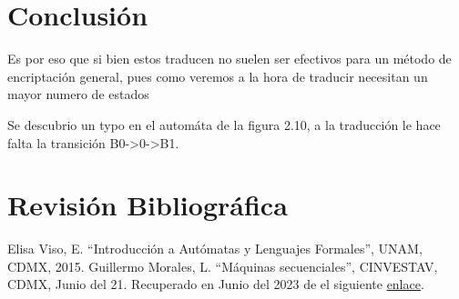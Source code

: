 \documentclass[11pt,letterpaper]{article}
\begin{document}
\begin{multicols}{2}
  \section{Conclusión}
  Es por eso que si bien estos traducen no suelen ser efectivos
  para un método de encriptación general, pues como veremos a la hora de traducir necesitan
  un mayor numero de estados

  Se descubrio un typo en el automáta de la figura 2.10\cite{Viso}, a la traducción
  le hace falta la transición B0->0->B1.
  \section{Revisión Bibliográfica}  
  \begin{thebibliography}{1}
   Elisa Viso, E. ``Introducción a Autómatas y Lenguajes Formales'',
    UNAM, CDMX, 2015.
   Guillermo Morales, L.  ``Máquinas secuenciales'',
    CINVESTAV, CDMX, Junio del 21. Recuperado en Junio del 2023 de el siguiente
    \href{https://delta.cs.cinvestav.mx/~gmorales/ta/node48.html}{enlace}.
  \end{thebibliography}  
\end{multicols}
\end{document}
